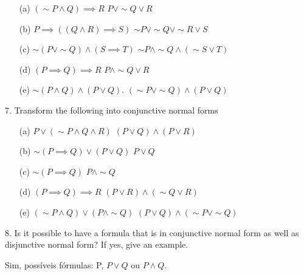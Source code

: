 \begin{enumerate}
 \item[(a)] $ (\sim P \wedge Q) \implies R $ \newline
$P \vee \sim Q \vee R$
 \item[(b)] $ P \implies \left( ( Q \wedge R) \implies S \right)$ \newline
$ \sim P \vee \sim Q \vee \sim R \vee S $
 \item[(c)] $ \sim (P \vee \sim Q) \wedge (S \implies T) $ \newline
$ \sim P \wedge \sim Q \wedge (\sim S \vee T) $
 \item[(d)] $ (P \implies Q) \implies R $ \newline
$ P \wedge \sim Q \vee R $
 \item[(e)] $ \sim (P \wedge Q) \wedge (P \vee Q) $. \newline
$ (\sim P \vee \sim Q) \wedge (P \vee Q) $
\end{enumerate}

7. Transform the following into conjunctive normal forms
\begin{itemize}
 \item[(a)] $ P \vee (\sim P \wedge Q \wedge R) $ \newline
$(P \vee Q) \wedge (P \vee R) $
 \item[(b)] $ \sim (P \implies Q) \vee (P \vee Q) $ \newline
$ P \vee Q $
 \item[(c)] $ \sim (P \implies Q) $ \newline
$ P \wedge \sim Q $
 \item[(d)] $ (P \implies Q) \implies R $ \newline
$ (P \vee R) \wedge (\sim Q \vee R) $
 \item[(e)] $ (\sim P \wedge Q) \vee (P \wedge \sim Q) $ \newline
$ (P \vee Q) \wedge (\sim P \vee \sim Q) $
\end{itemize}

8. Is it possible to have a formula that is in conjunctive normal form as well as disjunctive normal form? If yes, give an example.

Sim, possíveis fórmulas: P, $ P \vee Q $ ou $ P \wedge Q $.

